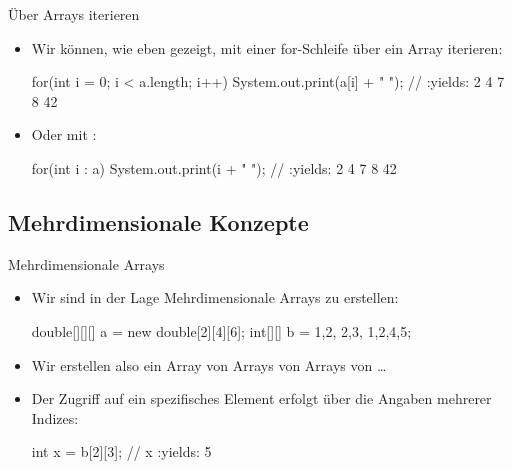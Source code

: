 \begin{frame}[fragile]{Über Arrays iterieren}
    \begin{itemize}[<+(1)->]
        \widei
        \item Wir können,\pause{} wie eben gezeigt,\pause{} mit einer for-Schleife über ein Array iterieren:\pause{}
\begin{plainjava}
for(int i = 0; i < a.length; i++) {
    System.out.print(a[i] + " "); // :yields: 2 4 7 8 42
}
\end{plainjava}
        \item Oder mit :\pause{}
\begin{plainjava}
for(int i : a) {
    System.out.print(i + " "); // :yields: 2 4 7 8 42
}
\end{plainjava}
    \end{itemize}
\end{frame}

\subsection{Mehrdimensionale Konzepte}%

\begin{frame}[fragile]{Mehrdimensionale Arrays}
    \begin{itemize}[<+(1)->]
        \widei
        \item Wir sind in der Lage Mehrdimensionale Arrays zu erstellen:\pause{}
\begin{plainjava}
double[][][] a = new double[2][4][6];
int[][] b = {{1,2}, {2,3}, {1,2,4,5}};
\end{plainjava}
        \item Wir erstellen also ein Array von Arrays von Arrays von \ldots
        \item Der Zugriff auf ein spezifisches Element erfolgt über die Angaben mehrerer Indizes:
\begin{plainjava}
int x = b[2][3]; // x :yields: 5
\end{plainjava}
    \end{itemize}
\end{frame}

